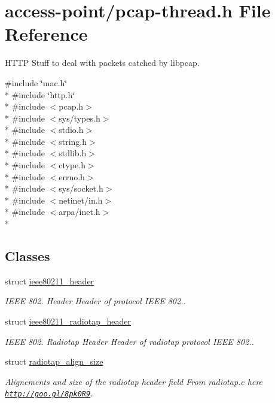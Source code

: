 \hypertarget{pcap-thread_8h}{\section{access-\/point/pcap-\/thread.h File Reference}
\label{pcap-thread_8h}
}


H\-T\-T\-P Stuff to deal with packets catched by libpcap.  


{\ttfamily \#include \char`\"{}mac.\-h\char`\"{}}\\*
{\ttfamily \#include \char`\"{}http.\-h\char`\"{}}\\*
{\ttfamily \#include $<$pcap.\-h$>$}\\*
{\ttfamily \#include $<$sys/types.\-h$>$}\\*
{\ttfamily \#include $<$stdio.\-h$>$}\\*
{\ttfamily \#include $<$string.\-h$>$}\\*
{\ttfamily \#include $<$stdlib.\-h$>$}\\*
{\ttfamily \#include $<$ctype.\-h$>$}\\*
{\ttfamily \#include $<$errno.\-h$>$}\\*
{\ttfamily \#include $<$sys/socket.\-h$>$}\\*
{\ttfamily \#include $<$netinet/in.\-h$>$}\\*
{\ttfamily \#include $<$arpa/inet.\-h$>$}\\*
\subsection*{Classes}
\begin{DoxyCompactItemize}
\item 
struct \hyperlink{structieee80211__header}{ieee80211\-\_\-header}
\begin{DoxyCompactList}\small\item\em I\-E\-E\-E 802. Header Header of protocol I\-E\-E\-E 802.. \end{DoxyCompactList}\item 
struct \hyperlink{structieee80211__radiotap__header}{ieee80211\-\_\-radiotap\-\_\-header}
\begin{DoxyCompactList}\small\item\em I\-E\-E\-E 802. Radiotap Header Header of radiotap protocol I\-E\-E\-E 802.. \end{DoxyCompactList}\item 
struct \hyperlink{structradiotap__align__size}{radiotap\-\_\-align\-\_\-size}
\begin{DoxyCompactList}\small\item\em Alignements and size of the radiotap header field From radiotap.\-c here \href{http://goo.gl/8pk0R9}{\tt http\-://goo.\-gl/8pk0\-R9}. \end{DoxyCompactList}\end{DoxyCompactItemize}
